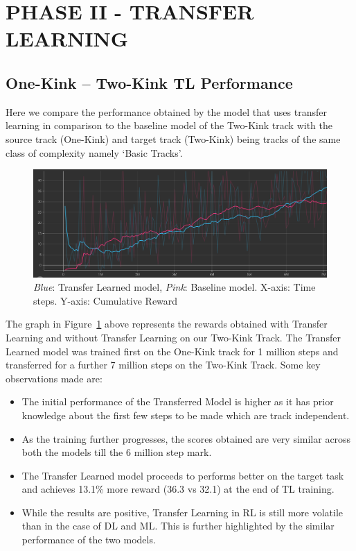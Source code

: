 \section{PHASE II - TRANSFER LEARNING}

\subsection{One-Kink -- Two-Kink TL Performance}

Here we compare the performance obtained by the model that uses
transfer learning in comparison to the baseline model of the Two-Kink
track with the source track (One-Kink) and target track (Two-Kink)
being tracks of the same class of complexity namely `Basic Tracks'.

\begin{figure}[H]
  \centering
  \includegraphics[width=1.0\textwidth]{images/graphs/TL-OneKink-TwoKink.png}
  \caption{\textit{Blue}: Transfer Learned model, \textit{Pink}:
    Baseline model. X-axis: Time steps. Y-axis: Cumulative Reward }
  \label{TL-OneKink-TwoKink}
\end{figure}
  
The graph in Figure~\ref{TL-OneKink-TwoKink} above represents the
rewards obtained with Transfer Learning and without Transfer Learning
on our Two-Kink Track. The Transfer Learned model was trained first on
the One-Kink track for 1 million steps and transferred for a further 7
million steps on the Two-Kink Track. Some key observations made are:
\begin{itemize}
\item The initial performance of the Transferred Model is higher as it
  has prior knowledge about the first few steps to be made which are
  track independent.
\item As the training further progresses, the scores obtained are very
  similar across both the models till the 6 million step mark.
\item The Transfer Learned model proceeds to performs better on the
  target task and achieves 13.1\% more reward (36.3 vs 32.1) at the
  end of TL training.
\item While the results are positive, Transfer Learning in RL is still
  more volatile than in the case of DL and ML. This is further
  highlighted by the similar performance of the two models.
\end{itemize}



